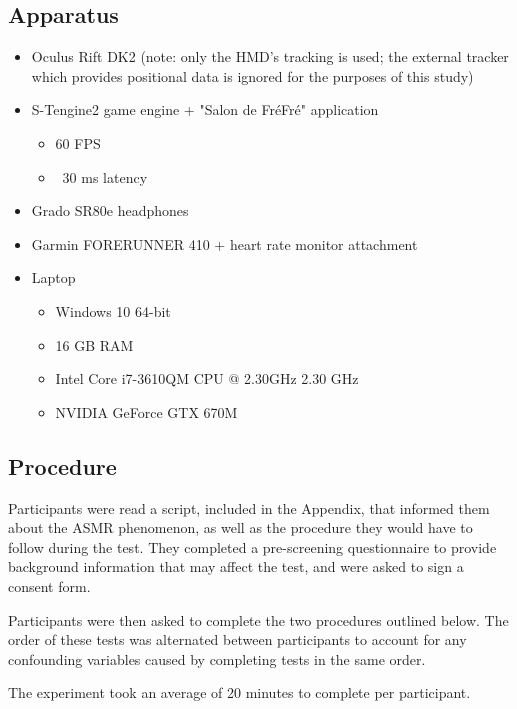 \documentclass{sigchi}
\begin{document}
\subsection{Apparatus}
\begin{itemize}
\item{Oculus Rift DK2 (note: only the HMD's tracking is used; the external tracker which provides positional data is ignored for the purposes of this study)}
\item{S-Tengine2 game engine + "Salon de Fr\'{e}Fr\'{e}" application
\begin{itemize}
\item{60 FPS}
\item{~30 ms latency}
\end{itemize}
}
\item{Grado SR80e headphones}
\item{Garmin FORERUNNER 410 + heart rate monitor attachment}
\item{Laptop
\begin{itemize}
\item{Windows 10 64-bit}
\item{16 GB RAM}
\item{Intel Core i7-3610QM CPU @ 2.30GHz 2.30 GHz}
\item{NVIDIA GeForce GTX 670M}
\end{itemize}
}
\end{itemize}

\subsection{Procedure}
Participants were read a script, included in the Appendix, that informed them about the ASMR phenomenon, as well as the procedure they would have to follow during the test. They completed a pre-screening questionnaire to provide background information that may affect the test, and were asked to sign a consent form.

Participants were then asked to complete the two procedures outlined below. The order of these tests was alternated between participants to account for any confounding variables caused by completing tests in the same order.

The experiment took an average of 20 minutes to complete per participant.
\end{document}
